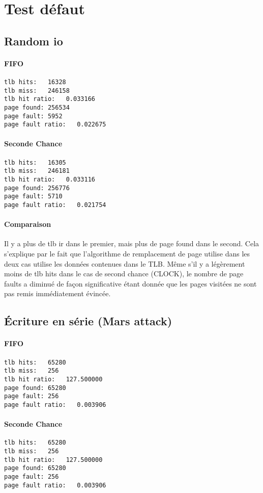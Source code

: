 \documentclass{article}
\begin{document}
\section*{Test défaut}
\subsection*{Random io}
\paragraph{FIFO}
\begin{lstlisting}
tlb hits:   16328
tlb miss:   246158
tlb hit ratio:   0.033166
page found: 256534
page fault: 5952
page fault ratio:   0.022675
\end{lstlisting}

\paragraph{Seconde Chance}
\begin{lstlisting}
tlb hits:   16305
tlb miss:   246181
tlb hit ratio:   0.033116
page found: 256776
page fault: 5710
page fault ratio:   0.021754
\end{lstlisting}
\paragraph{Comparaison}
Il y a plus de tlb ir dans le premier, mais plus de page found dans le second.
Cela s'explique par le fait que l'algorithme de remplacement de page utilise dans
les deux cas utilise les données contenues dans le TLB. Même s'il y a légèrement moins
de tlb hits dans le cas de second chance (CLOCK), le nombre de page faults a diminué de façon
significative étant donnée que les pages visitées ne sont pas remis immédiatement évincée.

\subsection*{Écriture en série (Mars attack)}
\paragraph{FIFO}
\begin{lstlisting}
tlb hits:   65280
tlb miss:   256
tlb hit ratio:   127.500000
page found: 65280
page fault: 256
page fault ratio:   0.003906
\end{lstlisting}

\paragraph{Seconde Chance}
\begin{lstlisting}
tlb hits:   65280
tlb miss:   256
tlb hit ratio:   127.500000
page found: 65280
page fault: 256
page fault ratio:   0.003906
\end{lstlisting}
\end{document}
